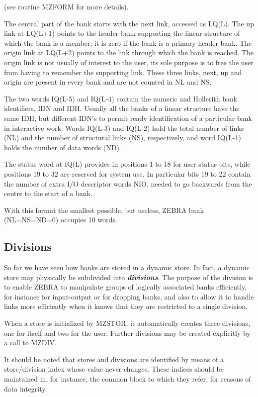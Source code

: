(see routine MZFORM for more details).
\par The central part of the bank starts with the next link,
accessed as LQ(L).
The up link at LQ(L+1) points to the header bank supporting
the linear structure of which the bank is a member;
it is zero if the bank is a primary header bank.
The origin link at LQ(L+2) points to the link
through which the bank is reached.
The origin link is not usually of interest to the user,
its sole purpose is to free the user from having to remember the
supporting link. These three links, next, up and origin are present
in every bank and are not counted in NL and NS.
\par
The two words IQ(L-5) and IQ(L-4) contain the numeric and Hollerith bank
identifiers, IDN and IDH. Usually all the banks of a linear structure
have the same IDH, but different IDN's to permit ready
identification of a particular bank in interactive work.
Words IQ(L-3) and IQ(L-2)
hold the total number of links (NL) and the number of structural
links (NS), respectively,
and word IQ(L-1) holds the number of data words (ND).
\par
The status word at IQ(L) provides in positions
1 to 18 for user status bits,
while positions 19 to 32 are reserved for system use. In particular
bits 19 to 22 contain the number of extra I/O descriptor words NIO,
needed to go backwards from the centre to the start of a bank.
\par
With this format the smallest possible, but useless, ZEBRA
bank (NL=NS=ND=0) occupies 10 words.
\par
\subsection{Divisions}
\par
So far we have seen how banks are stored in a dynamic
store. In fact, a dynamic store may physically be subdivided into
{\bf\it divisions}. The purpose of the division is to enable ZEBRA to
manipulate groups of logically associated banks efficiently, for instance
for input-output or for dropping banks, and also to allow it to handle links
more efficiently when it knows that they are restricted to a single
division.
\par
When a store is initialized by MZSTOR, it automatically creates three
divisions, one for itself and two for the user. Further divisions may be
created explicitly by a call to MZDIV.
\par
It should be noted that stores and divisions are identified by
means of a store/division index whose value never changes. These indices
should be maintained in, for instance, the common block to which they
refer, for reasons of
data integrity.
